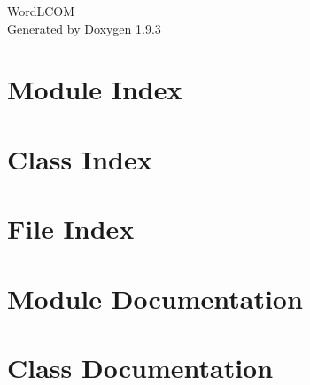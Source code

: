 \documentclass[twoside]{book}
\newcommand{\+}{\discretionary{\mbox{\scriptsize$\hookleftarrow$}}{}{}}
\newcommand{\clearemptydoublepage}{%
    \newpage{\pagestyle{empty}\cleardoublepage}%
  }
\begin{document}
  \raggedbottom
    \hypersetup{pageanchor=false,
                bookmarksnumbered=true,
                pdfencoding=unicode
               }
  \begin{titlepage}
  \vspace*{7cm}
  \begin{center}%
  {\Large Word\+LCOM}\\
  \vspace*{1cm}
  {\large Generated by Doxygen 1.9.3}\\
  \end{center}
  \end{titlepage}
  \clearemptydoublepage
  \tableofcontents
  \clearemptydoublepage
  \hypersetup{pageanchor=true}
\chapter{Module Index}

\chapter{Class Index}

\chapter{File Index}

\chapter{Module Documentation}

\chapter{Class Documentation}


















\end{document}
